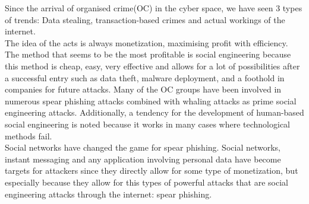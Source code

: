 \documentclass[12pt]{article} %
\begin{document}
Since the arrival of organised crime(OC) in the cyber space, we have seen 3 types of trends: Data stealing, transaction-based crimes and actual workings of the internet.\cite{future trends}\\
The idea of the acts is always monetization, maximising profit with efficiency. The method that seems to be the most profitable is social engineering because this method is cheap, easy, very effective and allows for a lot of possibilities after a successful entry such as data theft, malware deployment, and a foothold in companies for future attacks. Many of the OC groups have been involved in numerous spear phishing attacks combined with whaling attacks as prime social engineering attacks. Additionally, a tendency for the  development  of human-based social engineering is noted because it works in many cases where technological methods fail.\\
Social networks have changed the game for spear phishing. Social networks, instant messaging and any application involving personal data have become targets for attackers since they directly allow for some type of monetization, but especially because they allow for this types of powerful attacks that are social engineering attacks through the internet: spear phishing. \cite{state of phishing,social networks}
\end{document}
